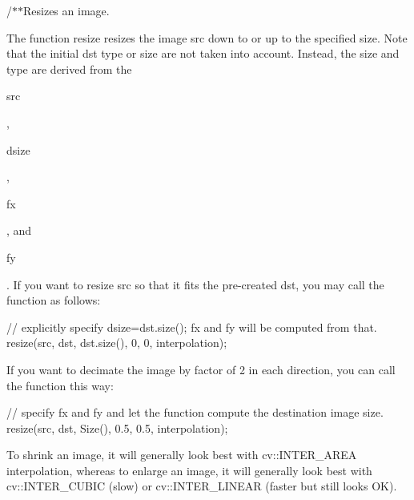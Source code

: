 /$\ast$$\ast$\+Resizes an image. 

The function resize resizes the image src down to or up to the specified size. Note that the initial dst type or size are not taken into account. Instead, the size and type are derived from the
\begin{DoxyCode}
src 
\end{DoxyCode}
 ,
\begin{DoxyCode}
dsize 
\end{DoxyCode}
 ,
\begin{DoxyCode}
fx 
\end{DoxyCode}
 , and
\begin{DoxyCode}
fy 
\end{DoxyCode}
 . If you want to resize src so that it fits the pre-\/created dst, you may call the function as follows\+: 
\begin{DoxyPre}
\begin{DoxyCode}
\textcolor{comment}{// explicitly specify dsize=dst.size(); fx and fy will be computed from that.}
resize(src, dst, dst.size(), 0, 0, interpolation);
\end{DoxyCode}
 \end{DoxyPre}
 If you want to decimate the image by factor of 2 in each direction, you can call the function this way\+: 
\begin{DoxyPre}
\begin{DoxyCode}
\textcolor{comment}{// specify fx and fy and let the function compute the destination image size.}
resize(src, dst, Size(), 0.5, 0.5, interpolation);
\end{DoxyCode}
 \end{DoxyPre}
 To shrink an image, it will generally look best with cv\+::\+I\+N\+T\+E\+R\+\_\+\+A\+R\+EA interpolation, whereas to enlarge an image, it will generally look best with cv\+::\+I\+N\+T\+E\+R\+\_\+\+C\+U\+B\+IC (slow) or cv\+::\+I\+N\+T\+E\+R\+\_\+\+L\+I\+N\+E\+AR (faster but still looks OK). 


